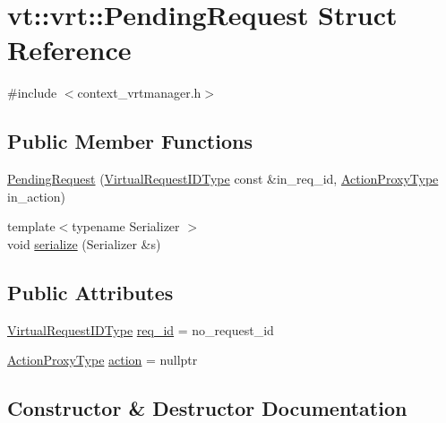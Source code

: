 \hypertarget{structvt_1_1vrt_1_1_pending_request}{}\section{vt\+:\+:vrt\+:\+:Pending\+Request Struct Reference}
\label{structvt_1_1vrt_1_1_pending_request}


{\ttfamily \#include $<$context\+\_\+vrtmanager.\+h$>$}

\subsection*{Public Member Functions}
\begin{DoxyCompactItemize}
\item 
\hyperlink{structvt_1_1vrt_1_1_pending_request_ad12718ee3fd4eb94d6fd09a2d7fc3793}{Pending\+Request} (\hyperlink{namespacevt_1_1vrt_ac7ef8820ebfc383fa16f09bf46eaa2b8}{Virtual\+Request\+I\+D\+Type} const \&in\+\_\+req\+\_\+id, \hyperlink{namespacevt_a102aa105d64254d89f7e585d106c95aa}{Action\+Proxy\+Type} in\+\_\+action)
\item 
{\footnotesize template$<$typename Serializer $>$ }\\void \hyperlink{structvt_1_1vrt_1_1_pending_request_ad82771e48d783f4074022b6e8ed518a9}{serialize} (Serializer \&s)
\end{DoxyCompactItemize}
\subsection*{Public Attributes}
\begin{DoxyCompactItemize}
\item 
\hyperlink{namespacevt_1_1vrt_ac7ef8820ebfc383fa16f09bf46eaa2b8}{Virtual\+Request\+I\+D\+Type} \hyperlink{structvt_1_1vrt_1_1_pending_request_a6b50fb651ed1f7f7a38220543b79f968}{req\+\_\+id} = no\+\_\+request\+\_\+id
\item 
\hyperlink{namespacevt_a102aa105d64254d89f7e585d106c95aa}{Action\+Proxy\+Type} \hyperlink{structvt_1_1vrt_1_1_pending_request_af6fddf631eb75dd7045f14ce76e30178}{action} = nullptr
\end{DoxyCompactItemize}


\subsection{Constructor \& Destructor Documentation}
\mbox{\label{structvt_1_1vrt_1_1_pending_request_ad12718ee3fd4eb94d6fd09a2d7fc3793}} 
